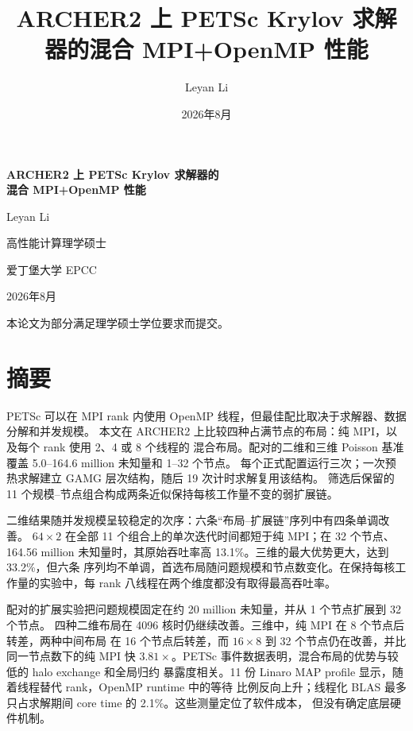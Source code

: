 \documentclass[11pt,a4paper,oneside]{report}
\title{ARCHER2 上 PETSc Krylov 求解器的混合 MPI+OpenMP 性能}
\author{Leyan Li}
\date{2026年8月}
\begin{document}
\hypersetup{pageanchor=false}
\begin{titlepage}
\centering
\vspace*{2cm}
{\LARGE\bfseries ARCHER2 上 PETSc Krylov 求解器的\\[0.3em]
混合 MPI+OpenMP 性能\par}
\vspace{2cm}
{\Large Leyan Li\par}
\vspace{1cm}
{\large 高性能计算理学硕士\par}
{\large 爱丁堡大学 EPCC\par}
\vspace{1cm}
{\large 2026年8月\par}
\vfill
{\normalsize 本论文为部分满足理学硕士学位要求而提交。\par}
\end{titlepage}
\hypersetup{pageanchor=true}
\clearpage

\chapter*{摘要}
PETSc 可以在 MPI rank 内使用 OpenMP 线程，但最佳配比取决于求解器、数据分解和并发规模。
本文在 ARCHER2 上比较四种占满节点的布局：纯 MPI，以及每个 rank 使用 2、4 或 8 个线程的
混合布局。配对的二维和三维 Poisson 基准覆盖 5.0--164.6 million 未知量和 1--32 个节点。
每个正式配置运行三次；一次预热求解建立 GAMG 层次结构，随后 19 次计时求解复用该结构。
筛选后保留的 11 个规模--节点组合构成两条近似保持每核工作量不变的弱扩展链。

二维结果随并发规模呈较稳定的次序：六条“布局--扩展链”序列中有四条单调改善。
$64\times2$ 在全部 11 个组合上的单次迭代时间都短于纯 MPI；在 32 个节点、
164.56 million 未知量时，其原始吞吐率高 13.1\%。三维的最大优势更大，达到 33.2\%，但六条
序列均不单调，首选布局随问题规模和节点数变化。在保持每核工作量的实验中，每 rank
八线程在两个维度都没有取得最高吞吐率。

配对的扩展实验把问题规模固定在约 20 million 未知量，并从 1 个节点扩展到 32 个节点。
四种二维布局在 4096 核时仍继续改善。三维中，纯 MPI 在 8 个节点后转差，两种中间布局
在 16 个节点后转差，而 $16\times8$ 到 32 个节点仍在改善，并比同一节点数下的纯 MPI
快 $3.81\times$。PETSc 事件数据表明，混合布局的优势与较低的 halo exchange 和全局归约
暴露度相关。11 份 Linaro MAP profile 显示，随着线程替代 rank，OpenMP runtime 中的等待
比例反向上升；线程化 BLAS 最多只占求解期间 core time 的 2.1\%。这些测量定位了软件成本，
但没有确定底层硬件机制。
\end{document}
